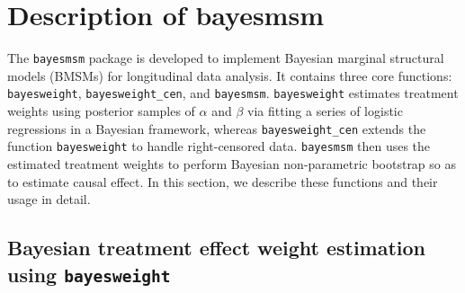 \section{Description of bayesmsm}\label{description-of-bayesmsm}

The \texttt{bayesmsm} package is developed to implement Bayesian marginal
structural models (BMSMs) for longitudinal data analysis. It contains
three core functions: \texttt{bayesweight}, \texttt{bayesweight\_cen}, and \texttt{bayesmsm}.
\texttt{bayesweight} estimates treatment weights using posterior samples of
\(\alpha\) and \(\beta\) via fitting a series of logistic regressions in a
Bayesian framework, whereas \texttt{bayesweight\_cen} extends the function
\texttt{bayesweight} to handle right-censored data. \texttt{bayesmsm} then uses the
estimated treatment weights to perform Bayesian non-parametric bootstrap
so as to estimate causal effect. In this section, we describe these
functions and their usage in detail.

\subsection{\texorpdfstring{Bayesian treatment effect weight estimation using \texttt{bayesweight}}{Bayesian treatment effect weight estimation using bayesweight}}\label{bayesian-treatment-effect-weight-estimation-using-bayesweight}

